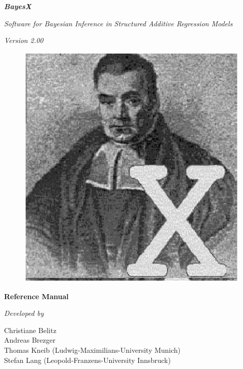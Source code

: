 
\thispagestyle{empty}

\begin{center}
{\bf \em \huge BayesX}

\vspace{0.5cm}

{\em \large Software for Bayesian Inference in Structured Additive
Regression Models}

\vspace{0.5cm}

{\em Version 2.00}

\vspace{0.5cm}

\begin{figure}[h]
\begin{center}
\includegraphics[scale=1.2]{grafiken/bayesicon.eps}
\end{center}
\end{figure}

\vfill

{\bf\sffamily \huge Reference Manual}

\vfill

\end{center}

{\em Developed by}

Christiane Belitz\\
Andreas Brezger\\
Thomas Kneib (Ludwig-Maximilians-University Munich)\\
Stefan Lang (Leopold-Franzens-University Innsbruck)

